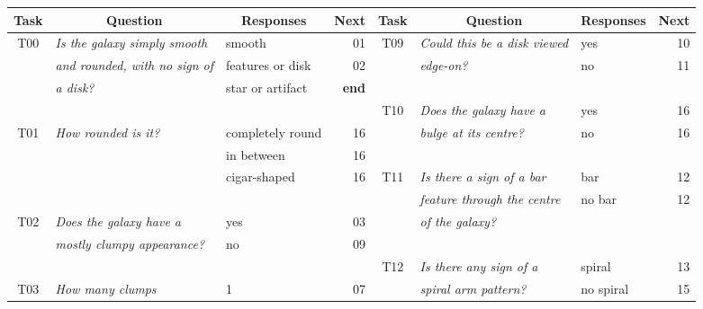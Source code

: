 \documentclass[useAMS,usenatbib]{mn2e}
\begin{document}
{\begin{table}
 \begin{tabular}{@{}cllr|cllr}
 \hline
\multicolumn{1}{l}{Task} &
\multicolumn{1}{c}{Question} &
\multicolumn{1}{c}{Responses} &
\multicolumn{1}{c}{Next} &
\multicolumn{1}{l|}{Task} &
\multicolumn{1}{c}{Question} &
\multicolumn{1}{c}{Responses} &
\multicolumn{1}{c}{Next} 
\\ 
\hline
\hline						
T00  & {\it Is the galaxy simply smooth       } & smooth            & 01         &  T09  & {\it Could this be a disk viewed   }  & yes              & 10 \\
     & {\it and rounded, with no sign of      } & features or disk  & 02         &       & {\it edge-on?                      }  & no               & 11 \\
     & {\it a disk?                           } & star or artifact  & {\bf end}  &       &                                       &                  &    \\
     &                                          &                   &            &  T10  & {\it Does the galaxy have a        }  & yes              & 16 \\
T01  & {\it How rounded is it?                } & completely round  & 16         &       & {\it bulge at its centre?          }  & no               & 16 \\
     & {\it                                   } & in between        & 16         &       &                                       &                  &    \\
     & {\it                                   } & cigar-shaped      & 16         &  T11  & {\it Is there a sign of a bar      }  & bar              & 12 \\
     &                                          &                   &            &       & {\it feature through the centre    }  & no bar           & 12 \\
T02  & {\it Does the galaxy have a            } & yes               & 03         &       & {\it of the galaxy?                }  &                  &    \\
     & {\it mostly clumpy appearance?         } & no                & 09         &       &                                       &                  &    \\
     &                                          &                   &            &  T12  & {\it Is there any sign of a        }  & spiral           & 13 \\
T03  & {\it How many clumps                   } & 1                 & 07         &       & {\it spiral arm pattern?           }  & no spiral        & 15 \\

\end{tabular}
\end{table}}
\end{document}
